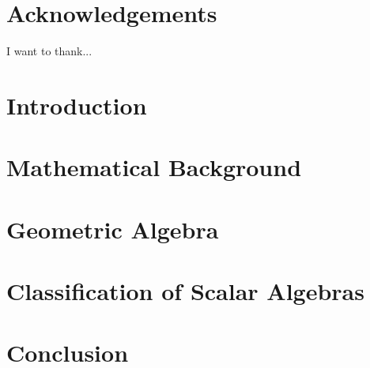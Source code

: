 \documentclass[12pt]{report}
\theoremstyle{definition}
\theoremstyle{definition}
\theoremstyle{remark}
\begin{document}




\chapter*{Acknowledgements}
I want to thank...

\tableofcontents
\listoffigures
\listoftables

\chapter{Introduction}


\chapter{Mathematical Background}


\chapter{Geometric Algebra}


\chapter{Classification of Scalar Algebras}


\chapter{Conclusion}


\printbibliography
\end{document}
